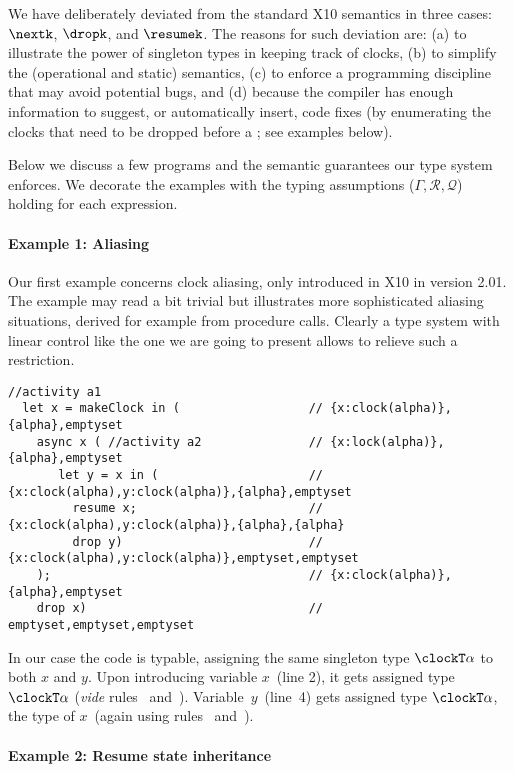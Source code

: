 We have deliberately deviated from the standard X10 semantics in three
cases: $\nextk$, $\dropk$, and $\resumek$. The reasons for such
deviation are: (a) to illustrate the power of singleton types in
keeping track of clocks, (b) to simplify the (operational and static)
semantics, (c) to enforce a programming discipline that may avoid
potential bugs, and (d) because the compiler has enough information to
suggest, or automatically insert, code fixes (\eg by enumerating the
clocks that need to be dropped before a \nextk; see examples below).

Below we discuss a few \xtenclocks programs and the semantic
guarantees our type system enforces.
We decorate the examples with the typing assumptions ($\Gamma,
\mathcal R, \mathcal Q$) holding for each expression.

\paragraph{Example 1: Aliasing}

Our first example concerns clock aliasing, only introduced in X10 in
version 2.01. The example may read a bit trivial but illustrates more
sophisticated aliasing situations, derived for example from procedure
calls. 
Clearly a type system with linear control like the one we are going to
present allows to relieve such a restriction.
\begin{lstlisting}[numbers=right]
  //activity a1
  let x = makeClock in (                  // {x:clock(alpha)},{alpha},emptyset
    async x ( //activity a2               // {x:lock(alpha)},{alpha},emptyset
       let y = x in (                     // {x:clock(alpha),y:clock(alpha)},{alpha},emptyset
         resume x;                        // {x:clock(alpha),y:clock(alpha)},{alpha},{alpha} 
         drop y)                          // {x:clock(alpha),y:clock(alpha)},emptyset,emptyset
    );                                    // {x:clock(alpha)},{alpha},emptyset 
    drop x)                               // emptyset,emptyset,emptyset
\end{lstlisting}
In our case the code is typable, assigning the same singleton type
$\clockT\alpha$ to both $x$ and $y$. Upon introducing variable
$x$~(line 2), it gets assigned type $\clockT \alpha$ (\textit{vide}
rules~\Tlet{} and~\Tmake). Variable~$y$~(line~4) gets assigned type
$\clockT \alpha$, the type of $x$~(again using rules~\Tlet{} and~\Tmake).

\paragraph{Example 2: Resume state inheritance}

